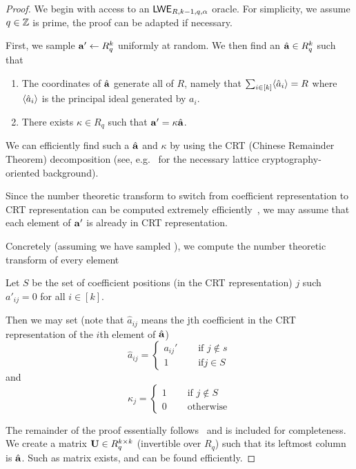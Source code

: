 \documentclass[oribibl,envcountsect,envcountsame]{llncs}
\begin{document}
\begin{proof}
We begin with access to an $\mathsf{LWE}_{R,k-1,q,\alpha}$ oracle. 
For simplicity, we assume $q \in \mathbb{Z}$ is prime, the proof can be adapted if necessary. 

First, we sample $\mathbf{a}' \gets R_q^{k}$ uniformly at random. We then find an $\hat{\mathbf{a}} \in R_q^{k}$ 
such that 
\begin{enumerate}
\item The coordinates of $\hat{\mathbf{a}}$ generate all of $R$, namely that
$\sum_{i \in [k]} \langle\hat{a}_i\rangle = R$ where $\langle\hat{a}_i\rangle$ is the principal ideal generated by 
$a_i$. 
\item There exists $\kappa \in R_q$  such that $\mathbf{a}' = \kappa\hat{\mathbf{a}}$. 
\end{enumerate}

We can efficiently find such a $\hat{\mathbf{a}}$ and $\kappa$ by using the CRT (Chinese Remainder Theorem) 
decomposition (see, e.g.~\cite{cryptoeprint:2011:133} for the necessary lattice cryptography-oriented background).

Since the number theoretic transform to switch from coefficient representation to CRT representation
can be computed extremely efficiently~\cite{longa2016speeding}, we may assume that each element of 
$\mathbf{a}'$ is already in CRT representation. 

Concretely (assuming we have sampled ), we compute the number theoretic transform of every element 

Let $S$ be the set of coefficient positions (in the CRT representation) $j$ such 
$a'_{ij} = 0$ for all $i \in [k]$.

Then we may set (note that $\hat{a}_{ij}$ means the jth coefficient in the CRT representation of the $i$th element of $\hat{\mathbf{a}}$) 
\[
\hat{a}_{ij} = \begin{cases}a_{ij}'&\quad \text{ if } j \notin s\\
                    1&\quad \text{ if} j \in S\end{cases} 
\]
and 
\[\kappa_{j} = \begin{cases}1&\quad\text{ if } j \notin S\\
                            0&\quad\text{ otherwise}\end{cases}\]

The remainder of the proof essentially follows~\cite{DBLP:conf/stoc/BrakerskiLPRS13} and 
is included for completeness. We create a 
matrix $\mathbf{U} \in R_q^{k \times k}$ (invertible over $R_q$) such that its leftmost column is $\hat{\mathbf{a}}$. 
Such as matrix exists, and can be found efficiently. 


\end{proof}
\end{document}
